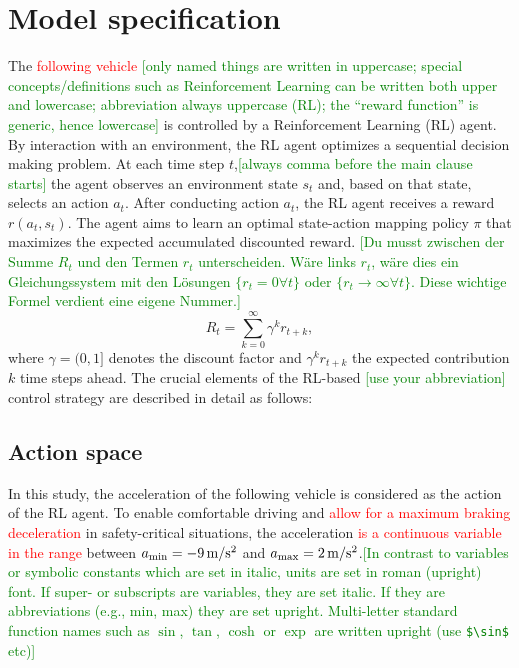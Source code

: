 \documentclass[review]{elsarticle}
\providecommand{\red}[1]{\textcolor{red}{#1}}
\providecommand{\green}[1]{\textcolor{green}{#1}}
\providecommand{\martin}[1]{\red{#1}} %
\providecommand{\martinc}[1]{\green{[#1]}} %
\providecommand{\3}{{\ss}}
\begin{document}
\section{Model specification}
The \martin{following vehicle} \martinc{only named things are written
    in uppercase; special concepts/definitions such as Reinforcement Learning
    can be written both upper and lowercase; abbreviation always
    uppercase (RL); the
    ``reward function'' is generic, hence lowercase} is controlled by a Reinforcement
Learning (RL) agent. By interaction with an environment, the RL agent
optimizes a sequential decision making problem. At each time step
$t$,\martinc{always comma before the main clause starts} the agent
observes an environment state $s_t$ and, based on that state, selects
an action $a_t$. After conducting action $a_t$, the RL agent receives
a reward $r(a_t,s_t)$. The agent aims to learn an optimal state-action
mapping policy $\pi$ that maximizes the expected accumulated
discounted reward. \martinc{Du musst zwischen der Summe $R_t$  und den
  Termen $r_t$ unterscheiden. W\"are links $r_t$, w\"are dies ein
  Gleichungssystem mit den L\"osungen $\{r_t=0 \forall t \} $ oder
  $\{r_t\to\infty \forall t \} $. Diese wichtige Formel verdient eine
  eigene Nummer.}
\begin{equation}
\label{Rt}
R_{t}=\sum_{k=0}^{\infty} \gamma^{k} r_{t+k},
\end{equation}
 where $\gamma = (0,1]$ denotes the discount factor and 
$\gamma^k r_{t+k}$ the expected contribution $k$ time steps ahead. The crucial elements
of the RL-based \martinc{use your abbreviation} control strategy are described
in detail as follows:

\subsection{Action space}
\label{actionSpace}
In this study, the acceleration of the following vehicle is considered
as the action of the RL agent. To enable comfortable driving and
\martin{allow for a maximum braking deceleration} in safety-critical
situations, the acceleration \martin{is a continuous variable in the
  range} between $a_{\rm min} = \unit[-9]{m/s^2}$ and 
$a_{\rm max} =\unit[2]{m/s^2}$.\martinc{In contrast to variables or symbolic
    constants which are set in italic, units are set in roman
    (upright) font. If super- or subscripts are variables, they are
    set italic. If they are abbreviations (e.g., min, max) they are set
    upright. Multi-letter standard function names such as $\sin$,
    $\tan$, $\cosh$ or $\exp$ are written upright (use
    \texttt{\$\textbackslash sin\$} etc)}
\end{document}
